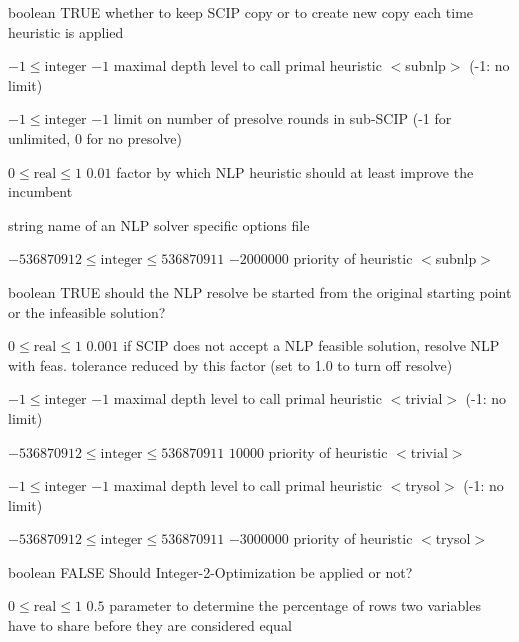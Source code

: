 %
{boolean}%
{TRUE}%
{whether to keep SCIP copy or to create new copy each time heuristic is applied}%
{}

%
{$-1\leq\textrm{integer}$}%
{$-1$}%
{maximal depth level to call primal heuristic $<$subnlp$>$ (-1: no limit)}%
{}

%
{$-1\leq\textrm{integer}$}%
{$-1$}%
{limit on number of presolve rounds in sub-SCIP (-1 for unlimited, 0 for no presolve)}%
{}

%
{$0\leq\textrm{real}\leq1$}%
{$0.01$}%
{factor by which NLP heuristic should at least improve the incumbent}%
{}

%
{string}%
{}%
{name of an NLP solver specific options file}%
{}

%
{$-536870912\leq\textrm{integer}\leq536870911$}%
{$-2000000$}%
{priority of heuristic $<$subnlp$>$}%
{}

%
{boolean}%
{TRUE}%
{should the NLP resolve be started from the original starting point or the infeasible solution?}%
{}

%
{$0\leq\textrm{real}\leq1$}%
{$0.001$}%
{if SCIP does not accept a NLP feasible solution, resolve NLP with feas. tolerance reduced by this factor (set to 1.0 to turn off resolve)}%
{}

%
{$-1\leq\textrm{integer}$}%
{$-1$}%
{maximal depth level to call primal heuristic $<$trivial$>$ (-1: no limit)}%
{}

%
{$-536870912\leq\textrm{integer}\leq536870911$}%
{$10000$}%
{priority of heuristic $<$trivial$>$}%
{}

%
{$-1\leq\textrm{integer}$}%
{$-1$}%
{maximal depth level to call primal heuristic $<$trysol$>$ (-1: no limit)}%
{}

%
{$-536870912\leq\textrm{integer}\leq536870911$}%
{$-3000000$}%
{priority of heuristic $<$trysol$>$}%
{}

%
{boolean}%
{FALSE}%
{ Should Integer-2-Optimization be applied or not?}%
{}

%
{$0\leq\textrm{real}\leq1$}%
{$0.5$}%
{parameter to determine the percentage of rows two variables have to share before they are considered equal}%
{}

